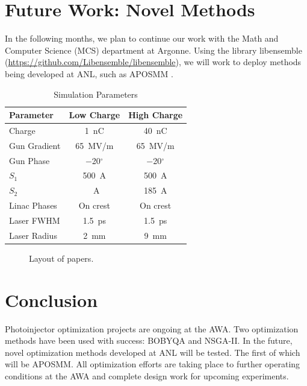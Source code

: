 \documentclass[letterpaper,  %
              ]{jacow-2_3}   %
\begin{document}
\section{Future Work: Novel Methods}
In the following months, we plan to continue our work with
the Math and Computer Science (MCS) department at Argonne.
Using the library libensemble (\url{https://github.com/Libensemble/libensemble}), 
we will work to deploy methods being developed at ANL, such as APOSMM \cite{jeff}. 





\begin{table}[hbt]
	\centering
	\caption{Simulation Parameters}
	\begin{tabular}{lcc}
		\toprule
		\textbf{Parameter} & \textbf{Low Charge}  & \textbf{High Charge} \\
		\midrule
		Charge       & \SI{1}{nC}        & \SI{40}{nC}    \\ %
		Gun Gradient & \SI{65}{MV/m}     & \SI{65}{MV/m}  \\ %
		Gun Phase    & \SI{-20}{}$^{\circ}$ & \SI{-20}{}$^{\circ}$ \\		 
		$S_1$        & \SI{500}{A}		 & \SI{500}{A}	  \\
		$S_2$		 & \SI{}{A}   	 & \SI{185}{A}		 \\
		Linac Phases & On crest          & On crest       \\
		Laser FWHM   & \SI{1.5}{ps}      & \SI{1.5}{ps}   \\ %
		Laser Radius & \SI{2}{mm}        & \SI{9}{mm}     \\
		\bottomrule
	\end{tabular}
	\label{simparam}
\end{table}


\begin{figure}[!htb]
	\centering
	\caption{Layout of papers.}
	\label{l2ea4-f1}
\end{figure}

\section{Conclusion}
Photoinjector optimization projects are ongoing at the AWA.
Two optimization methods have been used with success:
BOBYQA and NSGA-II. In the future, novel optimization 
methods developed at ANL will be tested. The first of 
which will be APOSMM. All optimization efforts are taking 
place to further operating conditions at the AWA and 
complete design work for upcoming experiments.
\end{document}
